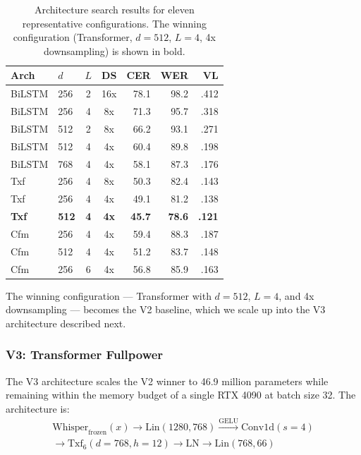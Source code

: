 \documentclass[11pt]{article}
\begin{document}
\begin{table}[t]
\centering
\small
\caption{Architecture search results for eleven representative configurations. The winning configuration (Transformer, $d=512$, $L=4$, 4x downsampling) is shown in bold.}
\label{tab:archsearch}
\begin{tabular}{@{}llccrrr@{}}
\toprule
Arch & $d$ & $L$ & DS & CER & WER & VL \\
\midrule
BiLSTM & 256 & 2 & 16x & 78.1 & 98.2 & .412 \\
BiLSTM & 256 & 4 & 8x & 71.3 & 95.7 & .318 \\
BiLSTM & 512 & 2 & 8x & 66.2 & 93.1 & .271 \\
BiLSTM & 512 & 4 & 4x & 60.4 & 89.8 & .198 \\
BiLSTM & 768 & 4 & 4x & 58.1 & 87.3 & .176 \\
Txf & 256 & 4 & 8x & 50.3 & 82.4 & .143 \\
Txf & 256 & 4 & 4x & 49.1 & 81.2 & .138 \\
\textbf{Txf} & \textbf{512} & \textbf{4} & \textbf{4x} & \textbf{45.7} & \textbf{78.6} & \textbf{.121} \\
Cfm & 256 & 4 & 4x & 59.4 & 88.3 & .187 \\
Cfm & 512 & 4 & 4x & 51.2 & 83.7 & .148 \\
Cfm & 256 & 6 & 4x & 56.8 & 85.9 & .163 \\
\bottomrule
\end{tabular}
\end{table}

The winning configuration --- Transformer with $d=512$, $L=4$, and 4x downsampling --- becomes the V2 baseline, which we scale up into the V3 architecture described next.

\subsubsection{V3: Transformer Fullpower}

The V3 architecture scales the V2 winner to 46.9 million parameters while remaining within the memory budget of a single RTX 4090 at batch size 32. The architecture is:
\begin{multline}
\text{Whisper}_{\text{frozen}}(x) \to \text{Lin}(1280, 768) \xrightarrow{\text{GELU}} \text{Conv1d}(s\!=\!4) \\
\to \text{Txf}_6(d\!=\!768, h\!=\!12) \to \text{LN} \to \text{Lin}(768, 66)
\label{eq:v3}
\end{multline}
\end{document}
